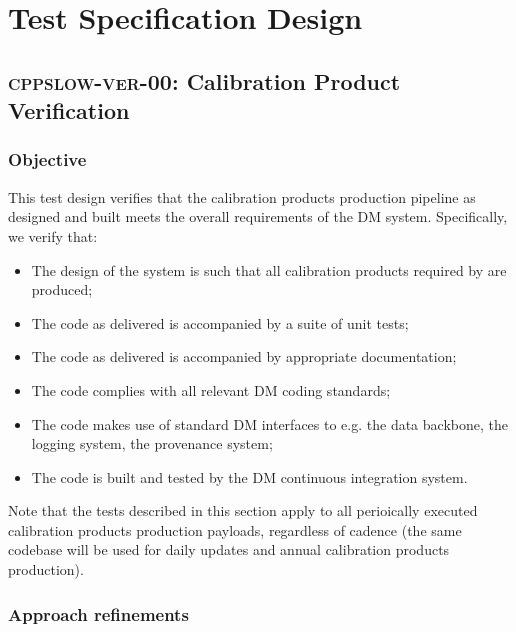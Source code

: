 \documentclass[DM,lsstdraft,STS,toc]{lsstdoc}
\begin{document}
\section{Test Specification Design}

\subsection{\textsc{cppslow-ver-00}: Calibration Product Verification}

\subsubsection{Objective}

This test design verifies that the calibration products production pipeline as
designed and built meets the overall requirements of the DM system.
Specifically, we verify that:

\begin{itemize}

  \item{The design of the system is such that all calibration products
  required by  are produced;}

  \item{The code as delivered is accompanied by a suite of unit tests;}

  \item{The code as delivered is accompanied by appropriate documentation;}

  \item{The code complies with all relevant DM coding standards;}

  \item{The code makes use of standard DM interfaces to e.g. the data
  backbone, the logging system, the provenance system;}

  \item{The code is built and tested by the DM continuous integration system.}

\end{itemize}

Note that the tests described in this section apply to all perioically
executed calibration products production payloads, regardless of cadence (the
same codebase will be used for daily updates and annual calibration products
production).

\subsubsection{Approach refinements}
\end{document}
